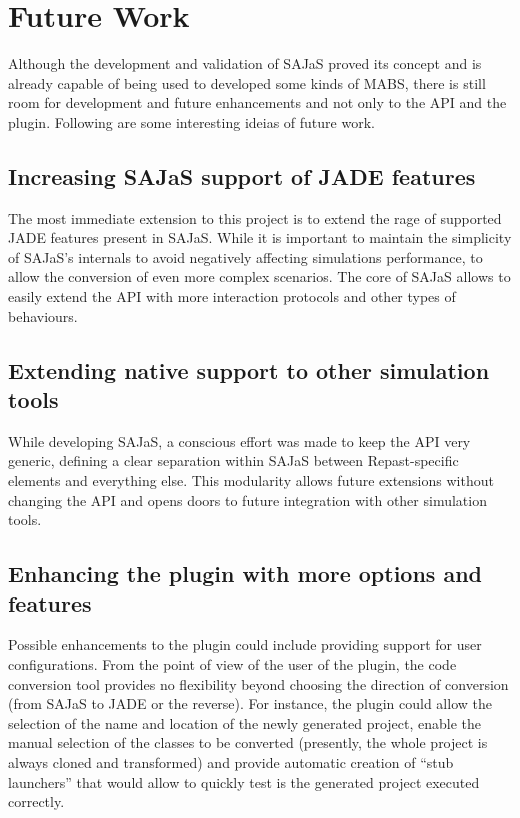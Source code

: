 \section{Future Work}
Although the development and validation of SAJaS proved its concept and is already capable of being used to developed some kinds of MABS, there is still room for development and future enhancements and not only to the API and the plugin. Following are some interesting ideias of future work.

\subsection{Increasing SAJaS support of JADE features}
The most immediate extension to this project is to extend the rage of supported JADE features present in SAJaS. While it is important to maintain the simplicity of SAJaS's internals to avoid negatively affecting simulations performance, to allow the conversion of even more complex scenarios. The core of SAJaS allows to easily extend the API with more interaction protocols and other types of behaviours.

\subsection{Extending native support to other simulation tools}
While developing SAJaS, a conscious effort was made to keep the API very generic, defining a clear separation within SAJaS between Repast-specific elements and everything else. This modularity allows future extensions without changing the API and opens doors to future integration with other simulation tools.

\subsection{Enhancing the plugin with more options and features}
Possible enhancements to the plugin could include providing support for user configurations. From the point of view of the user of the plugin, the code conversion tool provides no flexibility beyond choosing the direction of conversion (from SAJaS to JADE or the reverse). For instance, the plugin could allow the selection of the name and location of the newly generated project, enable the manual selection of the classes to be converted (presently, the whole project is always cloned and transformed) and provide automatic creation of ``stub launchers'' that would allow to quickly test is the generated project executed correctly.

